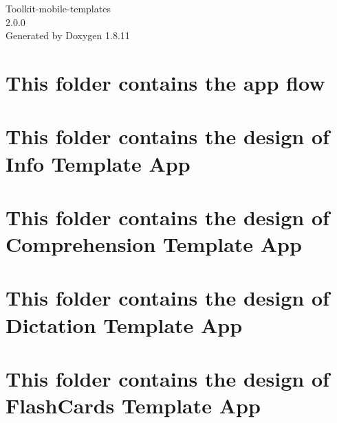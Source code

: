 \documentclass[twoside]{book}
\newcommand{\+}{\discretionary{\mbox{\scriptsize$\hookleftarrow$}}{}{}}
\newcommand{\clearemptydoublepage}{%
  \newpage{\pagestyle{empty}\cleardoublepage}%
}
\begin{document}
\hypersetup{pageanchor=false,
             bookmarksnumbered=true,
             pdfencoding=unicode
            }
\begin{titlepage}
\vspace*{7cm}
\begin{center}%
{\Large Toolkit-\/mobile-\/templates \\[1ex]\large 2.\+0.\+0 }\\
\vspace*{1cm}
{\large Generated by Doxygen 1.8.11}\\
\end{center}
\end{titlepage}
\clearemptydoublepage
\tableofcontents
\clearemptydoublepage
{}
\hypersetup{pageanchor=true}

\chapter{This folder contains the app flow}
\label{md_ui-design_app-flow_README}
\hypertarget{md_ui-design_app-flow_README}{}

\chapter{This folder contains the design of Info Template App}
\label{md_ui-design_Basic_mLearning_README}
\hypertarget{md_ui-design_Basic_mLearning_README}{}

\chapter{This folder contains the design of Comprehension Template App}
\label{md_ui-design_Comprehension_README}
\hypertarget{md_ui-design_Comprehension_README}{}

\chapter{This folder contains the design of Dictation Template App}
\label{md_ui-design_Dictation_README}
\hypertarget{md_ui-design_Dictation_README}{}

\chapter{This folder contains the design of Flash\+Cards Template App}
\label{md_ui-design_FlashCards_README}
\hypertarget{md_ui-design_FlashCards_README}{}

\end{document}
